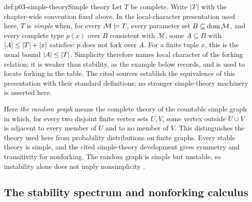 \begin{hbdefinition}{def:p03-simple-theory}{Simple theory}
Let \(T\) be complete.  Write
\(\lvert T\rvert\) with the chapter-wide convention fixed above.
In the local-character presentation used here, \(T\) is \emph{simple} when,
for every \(\mathcal M\models T\), every parameter set
\(B\subseteq\operatorname{dom}\mathcal M\), and every complete type \(p(x)\) over \(B\)
consistent with \(\mathcal M\), some \(A\subseteq B\) with
\(\lvert A\rvert\leq\lvert T\rvert+\lvert x\rvert\) satisfies: \(p\) does not fork over \(A\).
For a finite tuple \(x\), this is the usual bound
\(\lvert A\rvert\leq\lvert T\rvert\).  Simplicity therefore names local character of the
forking relation; it is weaker than stability, as the example below records,
and is used to locate forking in the table.  The cited sources establish the
equivalence of this presentation with their standard definitions; no stronger
simple-theory machinery is asserted here.
\end{hbdefinition}

Here \emph{the random graph} means the complete theory of the countable simple
graph in which, for every two disjoint finite vertex sets \(U,V\), some vertex
outside \(U\cup V\) is adjacent to every member of \(U\) and to no member of
\(V\).  This distinguishes the theory used here from probability distributions
on finite graphs.
Every stable theory is simple, and the cited simple-theory development gives
symmetry and transitivity for nonforking.  The random graph is simple but
unstable, so instability alone does not imply nonsimplicity
\cite{Shelah1971Stability,TentZiegler2012,Kim1998}.

\subsection{The stability spectrum and nonforking calculus}

